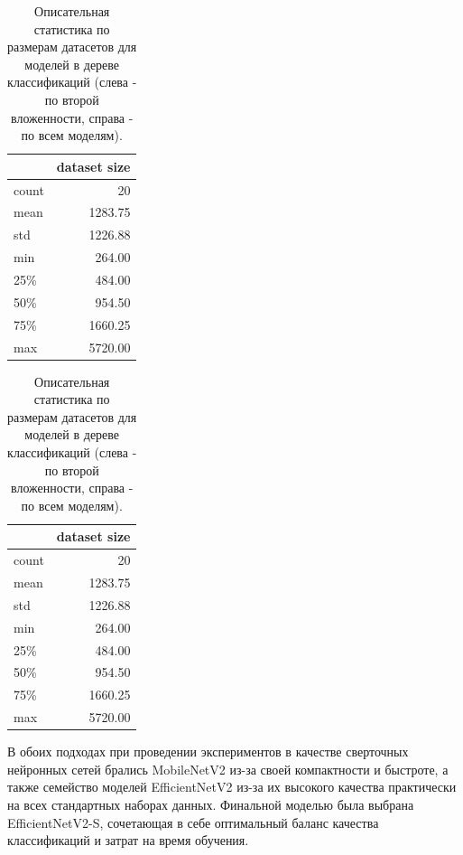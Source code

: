 \documentclass[a4paper,12pt]{extarticle}
\begin{document}
\begin{table}[ht]
	\caption{Описательная статистика по размерам датасетов для моделей в дереве классификаций (слева - по второй вложенности, справа - по всем моделям).} 
	\label{table:modelstatistic1}
	\footnotesize
	\centering
	\begin{tabular}{l|r}
		\toprule
		{} & \multicolumn{1}{c}{dataset size}\\
		\midrule
		count &	20\\
		mean  & 1283.75\\
		std   & 1226.88\\
		min   &	264.00\\
		25\%  &	484.00\\
		50\%  &	954.50\\
		75\%  &	1660.25\\
		max   &	5720.00\\
		\bottomrule
	\end{tabular}
	\hspace{2cm}
	\begin{tabular}{l|r}
		\toprule
		{} & \multicolumn{1}{c}{dataset size}\\
		\midrule
		count &	20\\
		mean  & 1283.75\\
		std   & 1226.88\\
		min   &	264.00\\
		25\%  &	484.00\\
		50\%  &	954.50\\
		75\%  &	1660.25\\
		max   &	5720.00\\
		\bottomrule
	\end{tabular}
\end{table}

В обоих подходах при проведении экспериментов в качестве сверточных нейронных сетей брались MobileNetV2 из-за своей компактности и быстроте, а также семейство моделей EfficientNetV2 из-за их высокого качества практически на всех стандартных наборах данных. Финальной моделью была выбрана EfficientNetV2-S, сочетающая в себе оптимальный баланс качества классификаций и затрат на время обучения.
\end{document}
